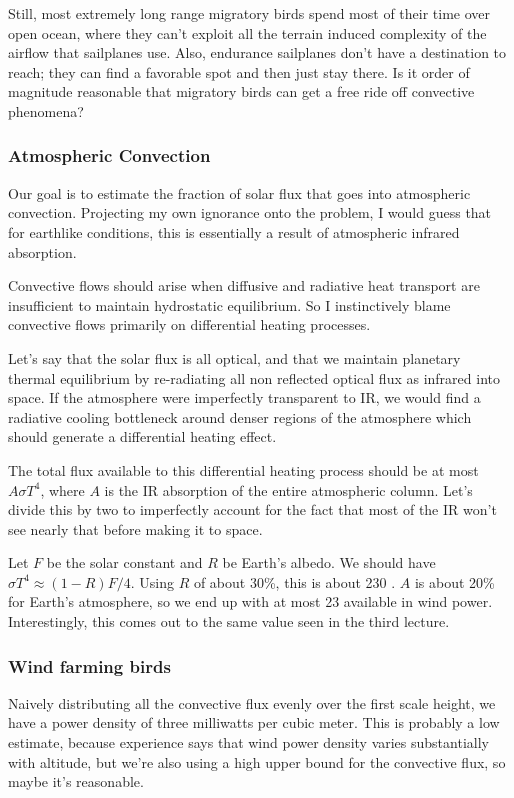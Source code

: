 \documentclass[12pt]{article}
\begin{document}
Still, most extremely long range migratory birds spend most of their time over open ocean, where they can't exploit all the terrain induced complexity of the airflow that sailplanes use. Also, endurance sailplanes don't have a destination to reach; they can find a favorable spot and then just stay there. Is it order of magnitude reasonable that migratory birds can get a free ride off convective phenomena?

\subsubsection{Atmospheric Convection}

Our goal is to estimate the fraction of solar flux that goes into atmospheric convection. Projecting my own ignorance onto the problem, I would guess that for earthlike conditions, this is essentially a result of atmospheric infrared absorption.

Convective flows should arise when diffusive and radiative heat transport are insufficient to maintain hydrostatic equilibrium. So I instinctively blame convective flows primarily on differential heating processes.

Let's say that the solar flux is all optical, and that we maintain planetary thermal equilibrium by re-radiating all non reflected optical flux as infrared into space. If the atmosphere were imperfectly transparent to IR, we would find a radiative cooling bottleneck around denser regions of the atmosphere which should generate a differential heating effect.

The total flux available to this differential heating process should be at most \(A \sigma T^4\), where \(A\) is the IR absorption of the entire atmospheric column. Let's divide this by two to imperfectly account for the fact that most of the IR won't see nearly that before making it to space.

Let \(F\) be the solar constant and \(R\) be Earth's albedo. We should have \(\sigma T^4 \approx (1-R)F/4\). Using \(R\) of about 30\%, this is about 230 \wmsq. \(A\) is about 20\% for Earth's atmosphere, so we end up with at most 23 \wmsq available in wind power. Interestingly, this comes out to the same value seen in the third lecture.

\subsubsection{Wind farming birds}

Naively distributing all the convective flux evenly over the first scale height, we have a power density of three milliwatts per cubic meter. This is probably a low estimate, because experience says that wind power density varies substantially with altitude, but we're also using a high upper bound for the convective flux, so maybe it's reasonable.
\end{document}
